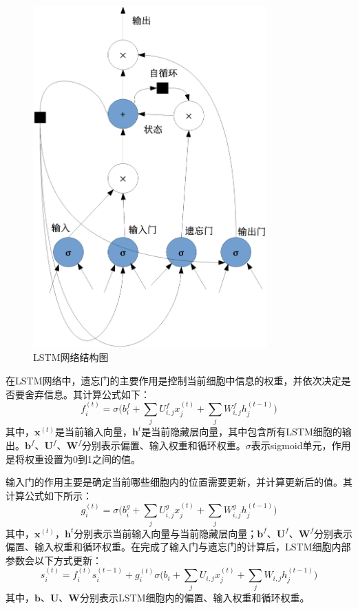 \begin{figure}[htbp]
    \begin{center}
        \includegraphics[width=0.8\textwidth, trim={0 20 0 20}, clip]{../graphics/LSTM_basic_arch.eps}
        \caption{LSTM网络结构图}
        \label{fig:LSTM_arch}
    \end{center}
\end{figure}

在LSTM网络中，遗忘门的主要作用是控制当前细胞中信息的权重，并依次决定是否要舍弃信息。其计算公式如下：
\begin{equation}
    f_i^{(t)}=\sigma\bigg(b_i^f+\sum_jU_{i,j}^fx_j^(t)+\sum_jW_{i,j}^fh_j^{(t-1)}\bigg)
    \label{eq:3}
\end{equation}
其中，$\textbf{x}^{(t)}$是当前输入向量，$\textbf{h}^t$是当前隐藏层向量，其中包含所有LSTM细胞的输出。$\textbf{b}^f$、$\textbf{U}^f$、$\textbf{W}^f$分别表示偏置、输入权重和循环权重。$\sigma$表示sigmoid单元，作用是将权重设置为0到1之间的值。

输入门的作用主要是确定当前哪些细胞内的位置需要更新，并计算更新后的值。其计算公式如下所示：
\begin{equation}
    g_i^{(t)}=\sigma\bigg(b_i^g+\sum_jU_{i,j}^gx_j^{(t)}+\sum_jW_{i,j}^gh_j^{(t-1)}\bigg)
    \label{eq:4}
\end{equation}
其中，$\textbf{x}^{(t)}$，$\textbf{h}^t$分别表示当前输入向量与当前隐藏层向量；$\textbf{b}^f$、$\textbf{U}^f$、$\textbf{W}^f$分别表示偏置、输入权重和循环权重。在完成了输入门与遗忘门的计算后，LSTM细胞内部参数会以下方式更新：
\begin{equation}
    s_i^{(t)}=f_i^{(t)}s_i^{(t-1)}+g_i^{(t)}\sigma\bigg(b_i+\sum_jU_{i,j}x_j^{(t)}+\sum_jW_{i,j}h_j^{(t-1)}\bigg)
    \label{eq:5}
\end{equation}
其中，$\textbf{b}$、$\textbf{U}$、$\textbf{W}$分别表示LSTM细胞内的偏置、输入权重和循环权重。

